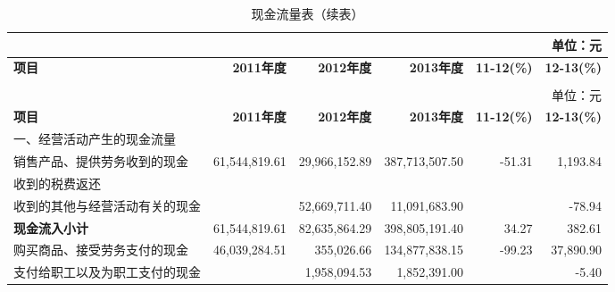 \renewcommand*{\arraystretch}{0.8}
\setlength{\tabcolsep}{4pt}
\begin{longtable}{>{\scriptsize}l>{\scriptsize}r>{\scriptsize}r>{\scriptsize}r>{\scriptsize}r>{\scriptsize}r}
\caption[现金流量表]{现金流量表}\\  %
&&&&& {\scriptsize 单位：元}\\
\hline\hline
\rowcolor{mycyan}	\hspace{3em} \bfseries 项目 	& \bfseries 2011年度\hspace{1em} & \bfseries 2012年度\hspace{1em} 	& \bfseries 2013年度\hspace{1em} &  \bfseries  11-12(\%)      & \hspace{1em} \bfseries  12-13(\%)  \\ \endfirsthead          %
\caption[]{现金流量表（续表）} \\ 
&&&&& {\scriptsize 单位：元}\\                        %
\hline\hline
\rowcolor{mycyan}	\hspace{3em} \bfseries 项目 	& \bfseries 2011年度\hspace{1em} & \bfseries 2012年度\hspace{1em} 	& \bfseries 2013年度\hspace{1em} &  \bfseries  11-12(\%)    & \hspace{1em} \bfseries  12-13(\%)  \\ \endhead         %
\hline
\endfoot
\hline   %
一、经营活动产生的现金流量 &  &  &  &  & 	\\		
\hspace{2em}销售产品、提供劳务收到的现金 & 61,544,819.61 & 29,966,152.89 & 387,713,507.50 & -51.31 & 1,193.84 \\
\hspace{2em}收到的税费返还 &   &  &  & & \\
\hspace{2em}收到的其他与经营活动有关的现金 &  & 52,669,711.40	 & 11,091,683.90	 &		 & -78.94 \\
\hspace{2em}\bfseries 现金流入小计 & 61,544,819.61& 82,635,864.29	& 398,805,191.40& 34.27	& 382.61 \\
\hspace{2em}购买商品、接受劳务支付的现金 & 46,039,284.51 & 355,026.66 & 	134,877,838.15	 & -99.23 & 37,890.90\\
\hspace{2em}支付给职工以及为职工支付的现金 & & 1,958,094.53& 	1,852,391.00& 		& 	-5.40 \\

\end{longtable}

